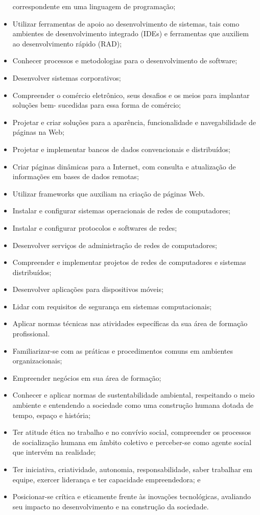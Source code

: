 \begin{itemize}
correspondente em uma linguagem de programação;
	\item Utilizar ferramentas de apoio ao desenvolvimento de sistemas, tais como ambientes de
desenvolvimento integrado (IDEs) e ferramentas que auxiliem ao desenvolvimento rápido
(RAD);
	\item Conhecer processos e metodologias para o desenvolvimento de software;
	\item Desenvolver sistemas corporativos;
	\item Compreender o comércio eletrônico, seus desafios e os meios para implantar soluções bem-
sucedidas para essa forma de comércio;
	\item Projetar e criar soluções para a aparência, funcionalidade e navegabilidade de páginas na
Web;
	\item Projetar e implementar bancos de dados convencionais e distribuídos;
	\item Criar páginas dinâmicas para a Internet, com consulta e atualização de informações em
bases de dados remotas;
	\item Utilizar frameworks que auxiliam na criação de páginas Web.
	\item Instalar e configurar sistemas operacionais de redes de computadores;
	\item Instalar e configurar protocolos e softwares de redes;
	\item Desenvolver serviços de administração de redes de computadores;
	\item Compreender e implementar projetos de redes de computadores e sistemas distribuídos;
	\item Desenvolver aplicações para dispositivos móveis;
	\item Lidar com requisitos de segurança em sistemas computacionais;
	\item Aplicar normas técnicas nas atividades específicas da sua área de formação profissional.
	\item Familiarizar-se com as práticas e procedimentos comuns em ambientes organizacionais;
	\item Empreender negócios em sua área de formação;
	\item Conhecer e aplicar normas de sustentabilidade ambiental, respeitando o meio ambiente e entendendo a sociedade como uma construção humana dotada de tempo, espaço e história;
	\item Ter atitude ética no trabalho e no convívio social, compreender os processos de socialização humana em âmbito coletivo e perceber-se como agente social que intervém na realidade;
	\item Ter iniciativa, criatividade, autonomia, responsabilidade, saber trabalhar em equipe, exercer liderança e ter capacidade empreendedora; e
	\item Posicionar-se crítica e eticamente frente às inovações tecnológicas, avaliando seu impacto no desenvolvimento e na construção da sociedade.
\end{itemize}

